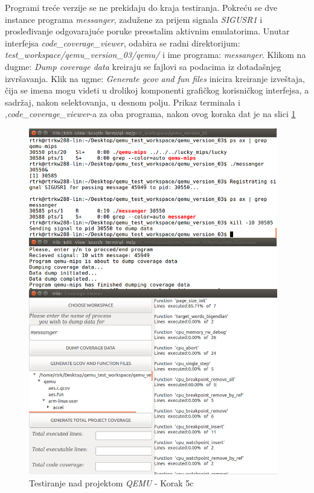 \documentclass[12pt,oneside]{memoir}
\newcommand{\strano}[1]{\textit{#1}}
\begin{document}
Programi treće verzije se ne prekidaju do kraja testiranja. Pokreću se dve instance programa \strano{messanger}, zadužene za prijem signala \strano{SIGUSR1} i prosleđivanje odgovarajuće poruke preostalim aktivnim emulatorima. Unutar interfejsa \strano{code\_coverage\_viewer}, odabira se radni direktorijum: \\ \strano{test\_workspace/qemu\_version\_03/qemu/} i ime programa: \strano{messanger}. Klikom na dugme: \strano{Dump coverage data} kreiraju se fajlovi sa podacima iz dotadašnjeg izvršavanja. Klik na ugme: \strano{Generate gcov and fun files} inicira kreiranje izveštaja, čija se imena mogu videti u drolikoj komponenti grafičkog korisničkog interfejsa, a sadržaj, nakon selektovanja, u desnom polju. Prikaz terminala i ,\strano{code\_coverage\_viewer}-a za oba programa, nakon ovog koraka dat je na slici \ref{fig:qemu-test-5}

\begin{figure}[!ht]
  \centering
  \includegraphics[width=0.97\textwidth]{img/qemu-test-5-ng.png}
  \caption{Testiranje nad projektom \strano{QEMU} - Korak 5c}
  \label{fig:qemu-test-5}
\end{figure} 
\end{document}
